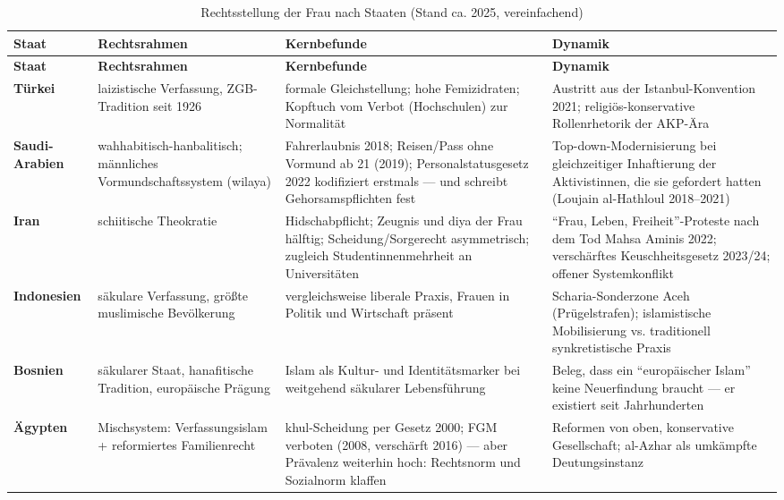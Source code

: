\documentclass[11pt,a4paper,ngerman]{scrartcl}
\begin{document}
\begin{small}
\begin{longtable}{>{\raggedright\arraybackslash}p{}>{\raggedright\arraybackslash}p{}>{\raggedright\arraybackslash}p{}>{\raggedright\arraybackslash}p{}}
\caption{Rechtsstellung der Frau nach Staaten (Stand ca. 2025, vereinfachend)}\\
\toprule
\textbf{Staat} & \textbf{Rechtsrahmen} & \textbf{Kernbefunde} & \textbf{Dynamik}\\
\midrule
\endfirsthead
\toprule
\textbf{Staat} & \textbf{Rechtsrahmen} & \textbf{Kernbefunde} & \textbf{Dynamik}\\
\midrule
\endhead
\textbf{Türkei} & laizistische Verfassung, ZGB-Tradition seit 1926 & formale Gleichstellung; hohe Femizidraten; Kopftuch vom Verbot (Hochschulen) zur Normalität & Austritt aus der Istanbul-Konvention 2021; religiös-konservative Rollenrhetorik der AKP-Ära \\
\addlinespace[2pt]
\textbf{Saudi-Arabien} & wahhabitisch-hanbalitisch; männliches Vormundschaftssystem (wilaya) & Fahrerlaubnis 2018; Reisen/Pass ohne Vormund ab 21 (2019); Personalstatusgesetz 2022 kodifiziert erstmals --- und schreibt Gehorsamspflichten fest & Top-down-Modernisierung bei gleichzeitiger Inhaftierung der Aktivistinnen, die sie gefordert hatten (Loujain al-Hathloul 2018--2021) \\
\addlinespace[2pt]
\textbf{Iran} & schiitische Theokratie & Hidschabpflicht; Zeugnis und diya der Frau hälftig; Scheidung/Sorgerecht asymmetrisch; zugleich Studentinnenmehrheit an Universitäten & \enquote{Frau, Leben, Freiheit}-Proteste nach dem Tod Mahsa Aminis 2022; verschärftes Keuschheitsgesetz 2023/24; offener Systemkonflikt \\
\addlinespace[2pt]
\textbf{Indonesien} & säkulare Verfassung, größte muslimische Bevölkerung & vergleichsweise liberale Praxis, Frauen in Politik und Wirtschaft präsent & Scharia-Sonderzone Aceh (Prügelstrafen); islamistische Mobilisierung vs. traditionell synkretistische Praxis \\
\addlinespace[2pt]
\textbf{Bosnien} & säkularer Staat, hanafitische Tradition, europäische Prägung & Islam als Kultur- und Identitätsmarker bei weitgehend säkularer Lebensführung & Beleg, dass ein \enquote{europäischer Islam} keine Neuerfindung braucht --- er existiert seit Jahrhunderten \\
\addlinespace[2pt]
\textbf{Ägypten} & Mischsystem: Verfassungsislam + reformiertes Familienrecht & khul-Scheidung per Gesetz 2000; FGM verboten (2008, verschärft 2016) --- aber Prävalenz weiterhin hoch: Rechtsnorm und Sozialnorm klaffen & Reformen von oben, konservative Gesellschaft; al-Azhar als umkämpfte Deutungsinstanz \\

\end{longtable}
\end{small}
\end{document}
